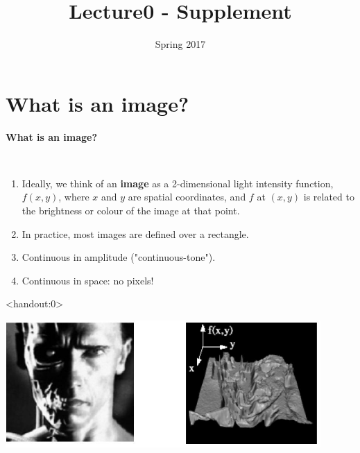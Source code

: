 \documentclass{beamer}
\title[Lecture0 - Supplement]{Lecture0 - Supplement}
\date{Spring 2017}
\begin{document}
\begin{frame}
  \titlepage
\end{frame}


\section{What is an image?}

\begin{frame}%

\textbf{What is an image?}	

\

\begin{enumerate}
	\item Ideally, we think of an \textbf{image} as a 2-dimensional light intensity function, 
	$f(x,y)$, where $x$	and $y$	are spatial coordinates, and $f$ at $(x,y)$
	is related to the brightness or colour of the image at that point.
	
	\item  In practice, most images are defined over a rectangle.
	
	\item Continuous in amplitude ("continuous-tone").
	
	\item Continuous in space: no pixels!
\end{enumerate}
	
\end{frame}

\begin{frame}<handout:0>
	
	\begin{center}
		\includegraphics[width=12cm]{./images/termin.jpg} 
	\end{center}
\end{frame}
\end{document}
